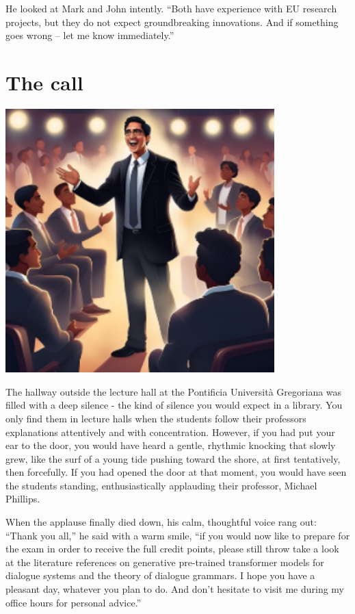 \documentclass[
]{article}
\begin{document}
He looked at Mark and John intently. ``Both have experience with EU
research projects, but they do not expect groundbreaking innovations.
And if something goes wrong -- let me know immediately.''

\section{The call}\label{the-call}

\includegraphics[width=4.09005in,height=4.01288in]{media/image12.png}

The hallway outside the lecture hall at the Pontificia Università
Gregoriana was filled with a deep silence - the kind of silence you
would expect in a library. You only find them in lecture halls when the
students follow their professor\textquotesingle s explanations
attentively and with concentration. However, if you had put your ear to
the door, you would have heard a gentle, rhythmic knocking that slowly
grew, like the surf of a young tide pushing toward the shore, at first
tentatively, then forcefully. If you had opened the door at that moment,
you would have seen the students standing, enthusiastically applauding
their professor, Michael Phillips.

When the applause finally died down, his calm, thoughtful voice rang
out: ``Thank you all,'' he said with a warm smile, ``if you would now
like to prepare for the exam in order to receive the full credit points,
please still throw take a look at the literature references on
generative pre-trained transformer models for dialogue systems and the
theory of dialogue grammars. I hope you have a pleasant day, whatever
you plan to do. And don't hesitate to visit me during my office hours
for personal advice.''
\end{document}

